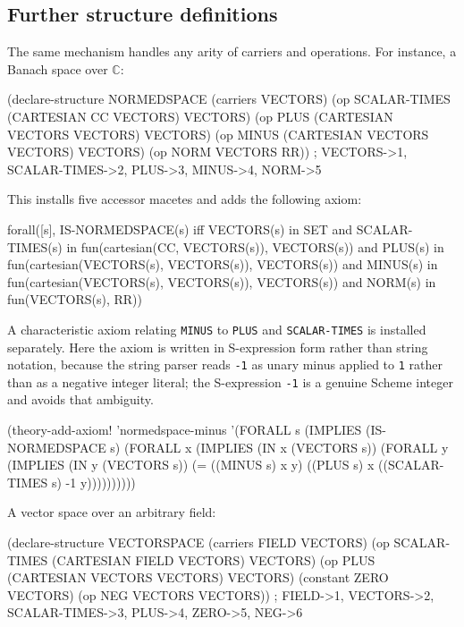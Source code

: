 

\subsection{Further structure definitions}

The same mechanism handles any arity of carriers and operations.  For
instance, a Banach space over $\mathbb{C}$:

\begin{VNBcode}
(declare-structure NORMEDSPACE
  (carriers VECTORS)
  (op SCALAR-TIMES (CARTESIAN CC VECTORS) VECTORS)
  (op PLUS         (CARTESIAN VECTORS VECTORS) VECTORS)
  (op MINUS        (CARTESIAN VECTORS VECTORS) VECTORS)
  (op NORM         VECTORS RR))
; VECTORS->1, SCALAR-TIMES->2, PLUS->3, MINUS->4, NORM->5
\end{VNBcode}

This installs five accessor macetes and adds the following axiom:
\begin{VNBsnip}
forall([s],
  IS-NORMEDSPACE(s) iff
    VECTORS(s) in SET
    and SCALAR-TIMES(s) in fun(cartesian(CC, VECTORS(s)), VECTORS(s))
    and PLUS(s) in fun(cartesian(VECTORS(s), VECTORS(s)), VECTORS(s))
    and MINUS(s) in fun(cartesian(VECTORS(s), VECTORS(s)), VECTORS(s))
    and NORM(s) in fun(VECTORS(s), RR))
\end{VNBsnip}

A characteristic axiom relating \texttt{MINUS} to \texttt{PLUS} and
\texttt{SCALAR-TIMES} is installed separately.  Here the axiom is written
in S-expression form rather than string notation, because the string
parser reads \texttt{-1} as unary minus applied to \texttt{1} rather than
as a negative integer literal; the S-expression \texttt{-1} is a genuine
Scheme integer and avoids that ambiguity.

\begin{VNBcode}
(theory-add-axiom! 'normedspace-minus
  '(FORALL s
     (IMPLIES (IS-NORMEDSPACE s)
       (FORALL x (IMPLIES (IN x (VECTORS s))
         (FORALL y (IMPLIES (IN y (VECTORS s))
           (= ((MINUS s) x y)
              ((PLUS s) x ((SCALAR-TIMES s) -1 y))))))))))
\end{VNBcode}

A vector space over an arbitrary field:
\begin{VNBcode}
(declare-structure VECTORSPACE
  (carriers FIELD VECTORS)
  (op SCALAR-TIMES (CARTESIAN FIELD VECTORS) VECTORS)
  (op PLUS         (CARTESIAN VECTORS VECTORS) VECTORS)
  (constant ZERO VECTORS)
  (op NEG          VECTORS VECTORS))
; FIELD->1, VECTORS->2, SCALAR-TIMES->3, PLUS->4, ZERO->5, NEG->6
\end{VNBcode}

